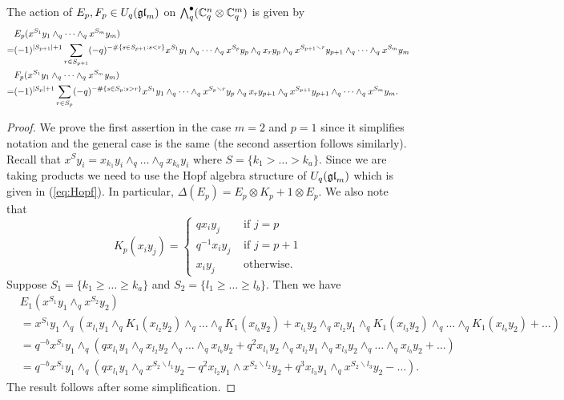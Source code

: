 \documentclass[11pt,leqno]{article}
\begin{document}
\begin{lem}
The action of $E_p,F_p \in U_q({\mathfrak{gl}}_m)$ on $\bigwedge_q^\bullet ({\mathbb{C}}_q^n \otimes {\mathbb{C}}_q^m)$ is given by 
\begin{align} \label{eq:Eaction}
& E_p (x^{S_1} y_1 \wedge_q \cdots \wedge_q x^{S_m}y_m)  \\
=& (-1)^{|S_{p+1}|+1} \sum_{r \in S_{p+1}} (-q)^{- \# \{s \in S_{p+1}: s < r \}} x^{S_1} y_1 \wedge_q \cdots \wedge_q x^{S_p} y_p \wedge_q x_r y_p \wedge_q x^{S_{p+1} \smallsetminus r} y_{p+1} \wedge_q \cdots \wedge_q x^{S_m} y_m \notag \\
\label{eq:Faction}
& F_p (x^{S_1} y_1 \wedge_q \cdots \wedge_q x^{S_m}y_m) \\
=& (-1)^{|S_p|+1} \sum_{r \in S_p} (-q)^{- \#\{s \in S_p: s > r \}} x^{S_1} y_1 \wedge_q \cdots \wedge_q x^{S_p \smallsetminus r} y_p \wedge_q x_r y_{p+1} \wedge_q x^{S_{p+1}} y_{p+1} \wedge_q \cdots \wedge_q x^{S_m} y_m. \notag
\end{align}
\end{lem}
\begin{proof}
We prove the first assertion in the case $m=2$ and $p=1$ since it simplifies notation and the general case is the same (the second assertion follows similarly). Recall that $x^Sy_i = x_{k_1}y_i \wedge_q \dots \wedge_q x_{k_a}y_i$ where $S = \{k_1 > \dots > k_a\}$. Since we are taking products we need to use the Hopf algebra structure of $U_q({\mathfrak{gl}}_m)$ which is given in (\ref{eq:Hopf}). In particular, $\Delta(E_p) = E_p \otimes K_p + 1 \otimes E_p$. We also note that 
$$K_p(x_iy_j) = 
\begin{cases}
q x_iy_j & \text{ if } j=p \\
q^{-1} x_iy_j & \text{ if } j=p+1 \\
x_iy_j & \text{ otherwise.}
\end{cases}$$
Suppose $S_1 = \{k_1 \ge \dots \ge k_a\}$ and $S_2 = \{l_1 \ge \dots \ge l_b\}$. Then we have
\begin{align*}
& E_1(x^{S_1}y_1 \wedge_q x^{S_2}y_2) \\
&= x^{S_1}y_1 \wedge_q ( x_{l_1}y_1 \wedge_q K_1(x_{l_2}y_2) \wedge_q \dots \wedge_q K_1(x_{l_b}y_2) + x_{l_1}y_2 \wedge_q x_{l_2}y_1 \wedge_q K_1(x_{l_3}y_2) \wedge_q \dots \wedge_q K_1(x_{l_b}y_2) + \dots ) \\ 
&= q^{-b} x^{S_1}y_1 \wedge_q ( q x_{l_1}y_1 \wedge_q x_{l_2}y_2 \wedge_q \dots \wedge_q x_{l_b}y_2 + q^2 x_{l_1}y_2 \wedge_q x_{l_2}y_1 \wedge_q x_{l_3}y_2 \wedge_q \dots \wedge_q x_{l_b}y_2 + \dots) \\
&= q^{-b} x^{S_1}y_1 \wedge_q (qx_{l_1}y_1 \wedge_q x^{S_2 \smallsetminus l_1} y_2 - q^2 x_{l_2}y_1 \wedge x^{S_2 \smallsetminus l_2} y_2 + q^3 x_{l_3}y_1 \wedge_q x^{S_2 \smallsetminus l_3} y_2 - \dots ).
\end{align*}
The result follows after some simplification. 
\end{proof}
\end{document}
